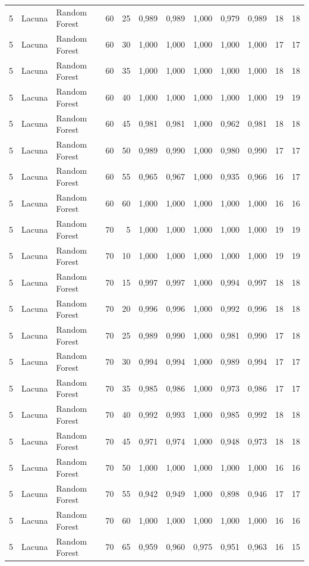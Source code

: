 \begin{longtable}{@{}rllrrrrrrrrr@{}}
5 & Lacuna & Random Forest & 60 & 25 & 0,989 & 0,989 & 1,000 & 0,979 & 0,989 & 18 & 18 \\
5 & Lacuna & Random Forest & 60 & 30 & 1,000 & 1,000 & 1,000 & 1,000 & 1,000 & 17 & 17 \\
5 & Lacuna & Random Forest & 60 & 35 & 1,000 & 1,000 & 1,000 & 1,000 & 1,000 & 18 & 18 \\
5 & Lacuna & Random Forest & 60 & 40 & 1,000 & 1,000 & 1,000 & 1,000 & 1,000 & 19 & 19 \\
5 & Lacuna & Random Forest & 60 & 45 & 0,981 & 0,981 & 1,000 & 0,962 & 0,981 & 18 & 18 \\
5 & Lacuna & Random Forest & 60 & 50 & 0,989 & 0,990 & 1,000 & 0,980 & 0,990 & 17 & 17 \\
5 & Lacuna & Random Forest & 60 & 55 & 0,965 & 0,967 & 1,000 & 0,935 & 0,966 & 16 & 17 \\
5 & Lacuna & Random Forest & 60 & 60 & 1,000 & 1,000 & 1,000 & 1,000 & 1,000 & 16 & 16 \\
5 & Lacuna & Random Forest & 70 & 5 & 1,000 & 1,000 & 1,000 & 1,000 & 1,000 & 19 & 19 \\
5 & Lacuna & Random Forest & 70 & 10 & 1,000 & 1,000 & 1,000 & 1,000 & 1,000 & 19 & 19 \\
5 & Lacuna & Random Forest & 70 & 15 & 0,997 & 0,997 & 1,000 & 0,994 & 0,997 & 18 & 18 \\
5 & Lacuna & Random Forest & 70 & 20 & 0,996 & 0,996 & 1,000 & 0,992 & 0,996 & 18 & 18 \\
5 & Lacuna & Random Forest & 70 & 25 & 0,989 & 0,990 & 1,000 & 0,981 & 0,990 & 17 & 18 \\
5 & Lacuna & Random Forest & 70 & 30 & 0,994 & 0,994 & 1,000 & 0,989 & 0,994 & 17 & 17 \\
5 & Lacuna & Random Forest & 70 & 35 & 0,985 & 0,986 & 1,000 & 0,973 & 0,986 & 17 & 17 \\
5 & Lacuna & Random Forest & 70 & 40 & 0,992 & 0,993 & 1,000 & 0,985 & 0,992 & 18 & 18 \\
5 & Lacuna & Random Forest & 70 & 45 & 0,971 & 0,974 & 1,000 & 0,948 & 0,973 & 18 & 18 \\
5 & Lacuna & Random Forest & 70 & 50 & 1,000 & 1,000 & 1,000 & 1,000 & 1,000 & 16 & 16 \\
5 & Lacuna & Random Forest & 70 & 55 & 0,942 & 0,949 & 1,000 & 0,898 & 0,946 & 17 & 17 \\
5 & Lacuna & Random Forest & 70 & 60 & 1,000 & 1,000 & 1,000 & 1,000 & 1,000 & 16 & 16 \\
5 & Lacuna & Random Forest & 70 & 65 & 0,959 & 0,960 & 0,975 & 0,951 & 0,963 & 16 & 15 \\

\end{longtable}
